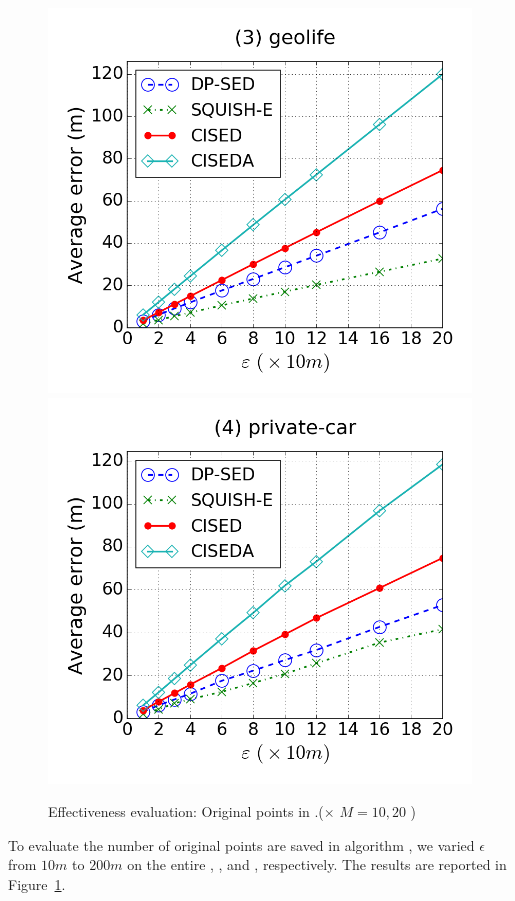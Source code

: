 {\begin{figure}[tb]
\includegraphics[scale = 0.245]{figures/Exp-error-epsilon-geolife.png}
\includegraphics[scale = 0.245]{figures/Exp-error-epsilon-private.png}
\vspace{-3ex}
\caption{\small Effectiveness evaluation: Original points in \cista.(\cista  $\times$ $M = 10, {20}$ )}
\label{fig:orig-points}
\vspace{-1ex}
\end{figure}

To evaluate the number of original points are saved in algorithm \cista, we varied $\epsilon$ from $10m$ to $200m$ on the entire \truck, \sercar, \geolife and \pricar, respectively.
The results are reported in Figure~\ref{fig:orig-points}.
}





